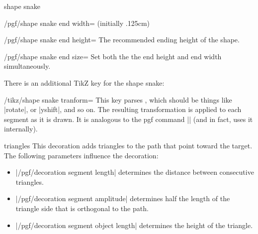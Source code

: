 \begin{decoration}{shape snake}
\begin{key}{/pgf/shape snake end width= (initially .125cm)}
\end{key}%

\begin{key}{/pgf/shape snake end height=}
  The recommended ending height of the shape.
\end{key}%

\begin{stylekey}{/pgf/shape snake end size=}
  Set both the the end height and end width simultaneously.
\end{stylekey}

There is an additional TikZ key for the shape snake:

\begin{stylekey}{/tikz/shape snake tranform=}
  This key parses , which should be things like |rotate|, or
  |yshift|, and so on. The resulting transformation is applied to each 
  segment as it is drawn. It is analogous to the pgf command
  |\pgfsetsnakesegmenttransformation| (and in fact, uses it internally).

\begin{codeexample}[]
\end{codeexample}
\end{stylekey}

\end{decoration}

\begin{decoration}{triangles}
	This decoration adds triangles to the path that point toward the
  target. The following parameters influence the decoration: 
  \begin{itemize}
  \item |/pgf/decoration segment length|
    determines the distance between consecutive triangles.
  \item |/pgf/decoration segment amplitude|
    determines half the length of the triangle side that is orthogonal
    to the path.
  \item |/pgf/decoration segment object length|
    determines the height of the triangle.
  \end{itemize}
\begin{codeexample}[]
\end{codeexample}
\end{decoration}

